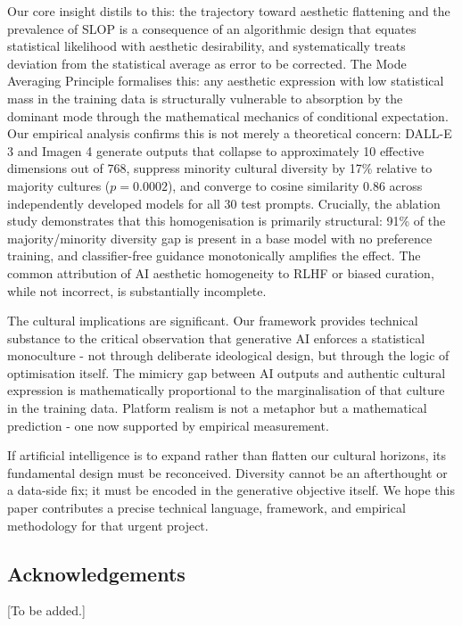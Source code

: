 \documentclass[11pt]{article}
\begin{document}
Our core insight distils to this: the trajectory toward aesthetic flattening and the prevalence of SLOP is a consequence of an algorithmic design that equates statistical likelihood with aesthetic desirability, and systematically treats deviation from the statistical average as error to be corrected. The Mode Averaging Principle formalises this: any aesthetic expression with low statistical mass in the training data is structurally vulnerable to absorption by the dominant mode through the mathematical mechanics of conditional expectation. Our empirical analysis confirms this is not merely a theoretical concern: DALL-E 3 and Imagen 4 generate outputs that collapse to approximately 10 effective dimensions out of 768, suppress minority cultural diversity by 17\% relative to majority cultures ($p = 0.0002$), and converge to cosine similarity 0.86 across independently developed models for all 30 test prompts. Crucially, the ablation study demonstrates that this homogenisation is primarily structural: 91\% of the majority/minority diversity gap is present in a base model with no preference training, and classifier-free guidance monotonically amplifies the effect. The common attribution of AI aesthetic homogeneity to RLHF or biased curation, while not incorrect, is substantially incomplete.

The cultural implications are significant. Our framework provides technical substance to the critical observation that generative AI enforces a statistical monoculture - not through deliberate ideological design, but through the logic of optimisation itself. The mimicry gap between AI outputs and authentic cultural expression is mathematically proportional to the marginalisation of that culture in the training data. Platform realism is not a metaphor but a mathematical prediction - one now supported by empirical measurement.

If artificial intelligence is to expand rather than flatten our cultural horizons, its fundamental design must be reconceived. Diversity cannot be an afterthought or a data-side fix; it must be encoded in the generative objective itself. We hope this paper contributes a precise technical language, framework, and empirical methodology for that urgent project.

\subsection*{Acknowledgements}
[To be added.]



\end{document}
